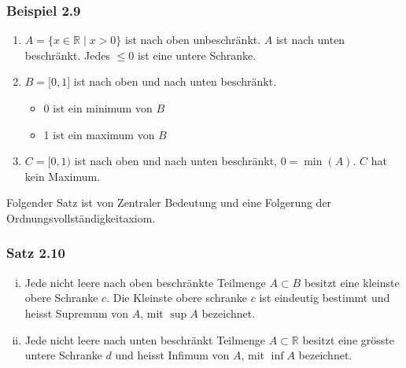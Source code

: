 \subsubsection*{Beispiel 2.9}
\begin{enumerate}
\item $A=\{x\in\mathbb{R}\mid x>0\}$ ist nach oben unbeschränkt. $A$ ist nach unten beschränkt. Jedes $\leq 0$ ist eine untere Schranke. 
\item $B=\lbrack 0,1\rbrack$ ist nach oben und nach unten beschränkt. \begin{itemize}
\item 0 ist ein minimum von $B$
\item 1 ist ein maximum von $B$ 
\end{itemize}
\item $C=\lbrack 0,1)$ ist nach oben und nach unten beschränkt, $0=\min(A)$. $C$ hat kein Maximum. 
\end{enumerate}
Folgender Satz ist von Zentraler Bedeutung und eine Folgerung der Ordnungsvollständigkeitaxiom.

\subsubsection*{Satz 2.10}
\begin{enumerate}[i)]
\item Jede nicht leere nach oben beschränkte Teilmenge $A\subset B$ besitzt eine kleinste obere Schranke $c$. Die Kleinste obere schranke $c$ ist eindeutig bestimmt und heisst Supremum von $A$, mit $\sup A$ bezeichnet. 
\item Jede nicht leere nach unten beschränkt Teilmenge $A\subset\mathbb{R}$ besitzt eine grösste untere Schranke $d$ und heisst Infimum von $A$, mit $\inf A$ bezeichnet.
\end{enumerate}
